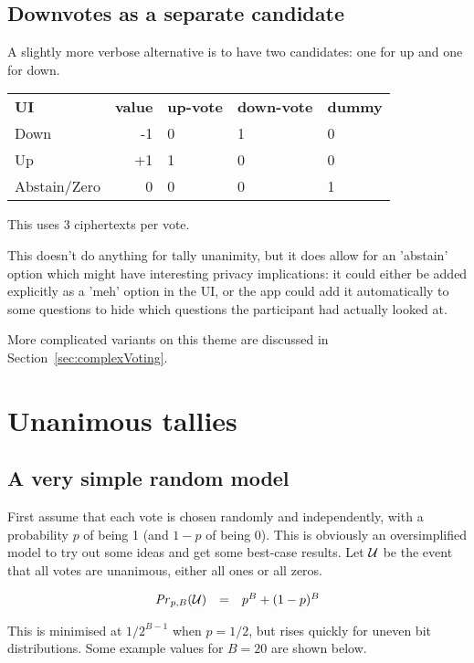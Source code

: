\documentclass[10pt,a4paper]{article}
\begin{document}
\subsection{Downvotes as a separate candidate}
A slightly more verbose alternative is to have two candidates: one for up and one for down.

\begin{tabular}{lrlll}
	\\
	{\bf UI}  & {\bf value }&{\bf  up-vote} &{\bf  down-vote} & {\bf  dummy }\\
	Down   & -1          & 0          & 1   & 0 \\
	Up   & +1          & 1          & 0    & 0\\ 
	Abstain/Zero & 0 & 0 & 0 & 1 \\
\end{tabular}
This uses 3 ciphertexts per vote.

This doesn't do anything for tally unanimity, but it does allow for an 'abstain' option which might have interesting privacy implications: it could either be added explicitly as a 'meh' option in the UI, or the app could add it automatically to some questions to hide which questions the participant had actually looked at.

More complicated variants on this theme are discussed in Section~\ref{sec:complexVoting}.

\section{Unanimous tallies}

\subsection{A very simple random model}
First assume that each vote is chosen randomly and independently, with a probability $p$ of being 1 (and $1-p$ of being 0). This is obviously an oversimplified model to try out some ideas and get some best-case results.
Let $\mathcal{U}$ be the event that all votes are unanimous, either all ones or all zeros.

$$
\begin{array}{rcl}
	\mathit{Pr}_{p,B}(\mathcal{U}) & = & p^{B} + (1-p)^B \\
\end{array}
$$

This is minimised at $1/2^{B-1}$ when $p=1/2$, but rises quickly for uneven bit distributions. Some example values for $B=20$ are shown below.
\end{document}
